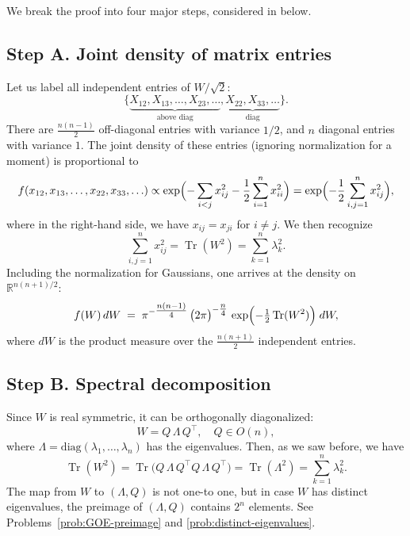 \documentclass[letterpaper,11pt,oneside,reqno]{article}
\numberwithin{equation}{section}
\theoremstyle{definition}
\begin{document}
We break the proof into four major steps,
considered in
below.

\subsection{Step A. Joint density of matrix entries}
\label{subsec:density-entries}

Let us label all independent entries of \(W/\sqrt 2\):
\[
	\{\underbrace{X_{12}, X_{13},\dots, X_{23},\ldots }_{\text{above diag}},
	\underbrace{X_{22}, X_{33},\dots}_{\text{diag}}\}.
\]
There are \(\frac{n(n-1)}{2}\) off-diagonal entries
with variance $1/2$,
and \(n\) diagonal entries with variance $1$.
The joint density of these entries (ignoring normalization for a moment) is
proportional to
\begin{equation}
	\label{eq:GOE-density-entries-first}
	f(x_{12},x_{13},\ldots,x_{22},x_{33},\ldots )
  \propto\exp\Bigl(
    - \sum_{i<j} x_{ij}^2
    -\frac{1}{2} \sum_{i=1}^n x_{ii}^2
  \Bigr)=
	\exp
	\Bigl( -\frac{1}{2}\sum_{i,j=1}^n x_{ij}^2 \Bigr),
\end{equation}
where in the right-hand side, we have
$x_{ij}=x_{ji}$ for $i\ne j$.
We then recognize
\[
	\sum_{i,j=1}^n x_{ij}^2=\operatorname{Tr}(W^2)=\sum_{k=1}^n \lambda_k^2.
\]
Including the normalization for Gaussians, one arrives at
the density on $\mathbb{R}^{n(n+1)/2}$:
\[
  f(W)\,dW
  \;=\;
  \pi^{-\tfrac{n(n-1)}{4}}
  \,\bigl(2\pi\bigr)^{-\tfrac{n}{4}}
  \,\exp\Bigl(-\tfrac{1}{2}\operatorname{Tr}(W^2)\Bigr)\; dW,
\]
where \(dW\) is the product measure over the \(\tfrac{n(n+1)}{2}\) independent entries.

\subsection{Step B. Spectral decomposition}
\label{subsec:spectral}

Since \(W\) is real symmetric, it can be orthogonally diagonalized:
\[
  W = Q\,\Lambda\,Q^\top,\quad
  Q \in O(n),
\]
where \(\Lambda = \mathrm{diag}(\lambda_1,\ldots,\lambda_n)\) has the eigenvalues.  Then, as we saw before, we have
\[
  \operatorname{Tr}(W^2)
  = \operatorname{Tr}\bigl(Q\,\Lambda\,Q^\top Q\,\Lambda\,Q^\top\bigr)
  = \operatorname{Tr}(\Lambda^2)
  = \sum_{k=1}^n \lambda_k^2.
\]
The map
from $W$ to $(\Lambda,Q)$ is not one-to one,
but in case $W$ has distinct eigenvalues,
the preimage of $(\Lambda,Q)$
contains $2^n$ elements.
See Problems~\ref{prob:GOE-preimage} and \ref{prob:distinct-eigenvalues}.
\medskip
\end{document}
